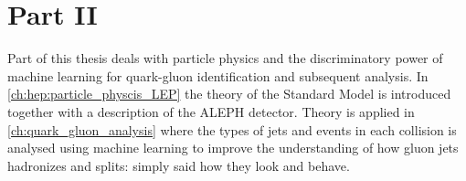 \documentclass[a4paper, twoside, nobib, justified]{tufte-book} %
\newcommand{\RNum}[1]{\uppercase\expandafter{\romannumeral #1\relax}}
\begin{document}





\chapter*{Part II}
Part \RNum{2} of this thesis deals with particle physics and the discriminatory power of machine learning for quark-gluon identification and subsequent analysis. In \autoref{ch:hep:particle_physcis_LEP} the theory of the Standard Model is introduced together with a description of the ALEPH detector. Theory is applied in \autoref{ch:quark_gluon_analysis} where the types of jets and events in each collision is analysed using machine learning to improve the understanding of how gluon jets hadronizes and splits: simply said how they look and behave. 






% 

% 




\appendix

% 

\end{document}
